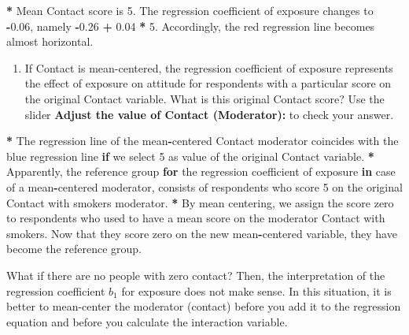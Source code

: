 \documentclass[a4paper]{book}
\newenvironment{Shaded}{\begin{snugshade}}{\end{snugshade}}
\newcommand{\DecValTok}[1]{\textcolor[rgb]{0.00,0.00,0.00}{#1}}
\newcommand{\FloatTok}[1]{\textcolor[rgb]{0.00,0.00,0.00}{#1}}
\newcommand{\StringTok}[1]{\textcolor[rgb]{0.00,0.00,0.00}{#1}}
\newcommand{\ControlFlowTok}[1]{\textcolor[rgb]{0.00,0.00,0.00}{\textbf{#1}}}
\newcommand{\OperatorTok}[1]{\textcolor[rgb]{0.00,0.00,0.00}{\textbf{#1}}}
\newcommand{\NormalTok}[1]{#1}
\providecommand{\tightlist}{%
  \setlength{\itemsep}{0pt}\setlength{\parskip}{0pt}}
\theoremstyle{definition}
\theoremstyle{definition}
\theoremstyle{definition}
\theoremstyle{remark}
\begin{document}
\begin{Shaded}
\begin{Highlighting}[]
\OperatorTok{*}\StringTok{ }\NormalTok{Mean Contact score is }\DecValTok{5}\NormalTok{. The regression coefficient of exposure changes to}
\OperatorTok{-}\FloatTok{0.06}\NormalTok{, namely }\OperatorTok{-}\FloatTok{0.26} \OperatorTok{+}\StringTok{ }\FloatTok{0.04} \OperatorTok{*}\StringTok{ }\DecValTok{5}\NormalTok{. Accordingly, the red regression line becomes}
\NormalTok{almost horizontal.}
\end{Highlighting}
\end{Shaded}

\begin{enumerate}
\def\labelenumi{\arabic{enumi}.}
\setcounter{enumi}{2}
\tightlist
\item
  If Contact is mean-centered, the regression coefficient of exposure
  represents the effect of exposure on attitude for respondents with a
  particular score on the original Contact variable. What is this
  original Contact score? Use the slider \textbf{Adjust the value of
  Contact (Moderator):} to check your answer.
\end{enumerate}

\begin{Shaded}
\begin{Highlighting}[]
\OperatorTok{*}\StringTok{ }\NormalTok{The regression line of the mean}\OperatorTok{-}\NormalTok{centered Contact moderator coincides with}
\NormalTok{the blue regression line }\ControlFlowTok{if}\NormalTok{ we select }\DecValTok{5}\NormalTok{ as value of the original Contact}
\NormalTok{variable. }
\OperatorTok{*}\StringTok{ }\NormalTok{Apparently, the reference group }\ControlFlowTok{for}\NormalTok{ the regression coefficient of exposure }\ControlFlowTok{in}
\NormalTok{case of a mean}\OperatorTok{-}\NormalTok{centered moderator, consists of respondents who score }\DecValTok{5}\NormalTok{ on the}
\NormalTok{original Contact with smokers moderator.}
\OperatorTok{*}\StringTok{ }\NormalTok{By mean centering, we assign the score zero to respondents who used to have}
\NormalTok{a mean score on the moderator Contact with smokers. Now that they score zero}
\NormalTok{on the new mean}\OperatorTok{-}\NormalTok{centered variable, they have become the reference group.}
\end{Highlighting}
\end{Shaded}

What if there are no people with zero contact? Then, the interpretation
of the regression coefficient \(b_1\) for exposure does not make sense.
In this situation, it is better to mean-center the moderator (contact)
before you add it to the regression equation and before you calculate
the interaction variable.
\end{document}
